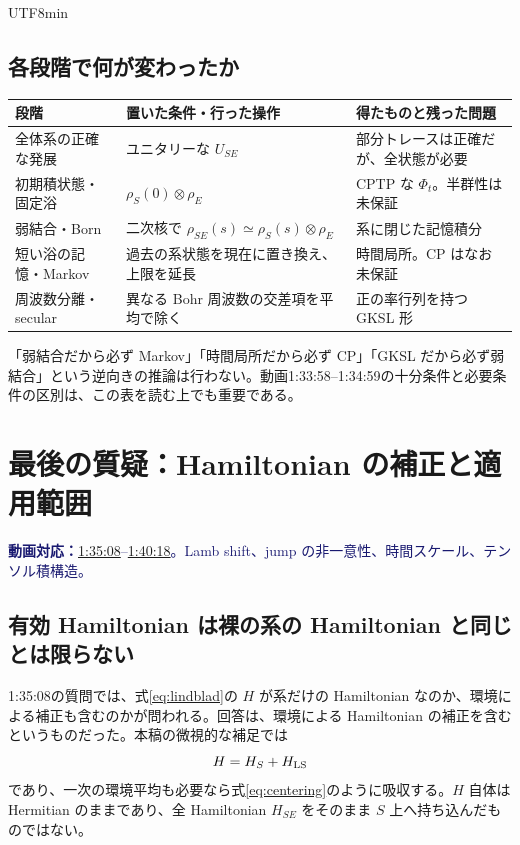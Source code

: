 \documentclass[11pt,a4paper]{article}
\numberwithin{equation}{section}
\newcommand{\vid}[2]{\href{https://www.youtube.com/watch?v=3gDSaNy1O7Y\&t=#1s}{#2}}
\newcommand{\source}[1]{\par\noindent\textcolor{MidnightBlue}{\textbf{動画対応：}#1}\par}
\begin{document}
\begin{CJK*}{UTF8}{min}
\subsection{各段階で何が変わったか}
\begin{longtable}{p{}p{}p{}}
\toprule
段階 & 置いた条件・行った操作 & 得たものと残った問題\\\midrule\endhead
全体系の正確な発展 & ユニタリーな $U_{SE}$ & 部分トレースは正確だが、全状態が必要\\
初期積状態・固定浴 & $\rho_S(0)\otimes\rho_E$ & CPTP な $\Phi_t$。半群性は未保証\\
弱結合・Born & 二次核で $\rho_{SE}(s)\simeq\rho_S(s)\otimes\rho_E$ & 系に閉じた記憶積分\\
短い浴の記憶・Markov & 過去の系状態を現在に置き換え、上限を延長 & 時間局所。CP はなお未保証\\
周波数分離・secular & 異なる Bohr 周波数の交差項を平均で除く & 正の率行列を持つ GKSL 形\\\bottomrule
\end{longtable}
「弱結合だから必ず Markov」「時間局所だから必ず CP」「GKSL だから必ず弱結合」という逆向きの推論は行わない。動画1:33:58--1:34:59の十分条件と必要条件の区別は、この表を読む上でも重要である。

\section{最後の質疑：Hamiltonian の補正と適用範囲}
\label{sec:questions}
\source{\vid{5708}{1:35:08}--\vid{6018}{1:40:18}。Lamb shift、jump の非一意性、時間スケール、テンソル積構造。}
\subsection{有効 Hamiltonian は裸の系の Hamiltonian と同じとは限らない}
1:35:08の質問では、式\eqref{eq:lindblad}の $H$ が系だけの Hamiltonian なのか、環境による補正も含むのかが問われる。回答は、環境による Hamiltonian の補正を含むというものだった。本稿の微視的な補足では
\begin{equation}
H=H_S+H_{\rm LS}
\end{equation}
であり、一次の環境平均も必要なら式\eqref{eq:centering}のように吸収する。$H$ 自体は Hermitian のままであり、全 Hamiltonian $H_{SE}$ をそのまま $S$ 上へ持ち込んだものではない。


\end{CJK*}
\end{document}
